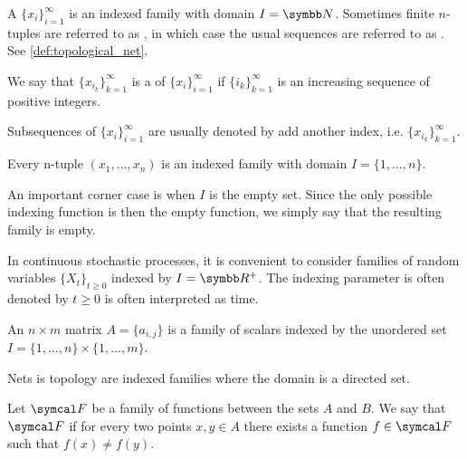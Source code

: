 \begin{definition}\label{def:sequence}
  A  \( \{ x_i \}_{i=1}^\infty \) is an indexed family with domain \( I = \BB N \). Sometimes finite \( n \)-tuples are referred to as , in which case the usual sequences are referred to as . See \cref{def:topological_net}.

  We say that \( \{ x_{i_k} \}_{k=1}^\infty \) is a  of \( \{ x_i \}_{i=1}^\infty \) if \( \{ i_k \}_{k=1}^\infty \) is an increasing sequence of positive integers.

  Subsequences of \( \{ x_i \}_{i=1}^\infty \) are usually denoted by add another index, i.e. \( \{ x_{i_k} \}_{k=1}^\infty \).
\end{definition}

\begin{example}\label{ex:indexed_families}
  \mbox{}
  \begin{defenum}
    \item Every n-tuple \( (x_1, \ldots, x_n) \) is an indexed family with domain \( I = \{ 1, \ldots, n \} \).

    \item An important corner case is when \( I \) is the empty set. Since the only possible indexing function is then the empty function, we simply say that the resulting family is empty.

    \item In continuous stochastic processes, it is convenient to consider families of random variables \( \{ X_t \}_{t \geq 0} \) indexed by \( I = \R^+ \). The indexing parameter is often denoted by \( t \geq 0 \) is often interpreted as time.

    \item An \( n \times m \) matrix \( A = \{ a_{i,j} \} \) is a family of scalars indexed by the unordered set \( I = \{ 1, \ldots, n \} \times \{ 1, \ldots, m \} \).

    \item Nets is topology are indexed families where the domain is a directed set.
  \end{defenum}
\end{example}

\begin{definition}\label{def:family_of_functions_separates_points}
  Let \( \Cal{F} \) be a family of functions between the sets \( A \) and \( B \). We say that \( \Cal{F} \)  if for every two points \( x, y \in A \) there exists a function \( f \in \Cal{F} \) such that \( f(x) \neq f(y) \).
\end{definition}

